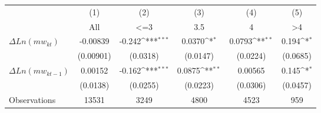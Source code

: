 {
\def\sym#1{\ifmmode^{#1}\else\(^{#1}\)\fi}
\begin{tabular}{l*{5}{c}}
\hline\hline
                    &\multicolumn{1}{c}{(1)}&\multicolumn{1}{c}{(2)}&\multicolumn{1}{c}{(3)}&\multicolumn{1}{c}{(4)}&\multicolumn{1}{c}{(5)}\\
                    &\multicolumn{1}{c}{All}&\multicolumn{1}{c}{<=3}&\multicolumn{1}{c}{3.5}&\multicolumn{1}{c}{4}&\multicolumn{1}{c}{>4}\\
\hline
$\Delta Ln(mw_{kt})$  &    -0.00839         &      -0.242\sym{***}&      0.0370\sym{*}  &      0.0793\sym{**} &       0.194\sym{*}  \\
                    &   (0.00901)         &    (0.0318)         &    (0.0147)         &    (0.0224)         &    (0.0685)         \\
[1em]
$\Delta Ln(mw_{kt-1})$&     0.00152         &      -0.162\sym{***}&      0.0875\sym{**} &     0.00565         &       0.145\sym{*}  \\
                    &    (0.0138)         &    (0.0255)         &    (0.0223)         &    (0.0306)         &    (0.0457)         \\
\hline
Observations        &       13531         &        3249         &        4800         &        4523         &         959         \\
\hline\hline
\end{tabular}
}
